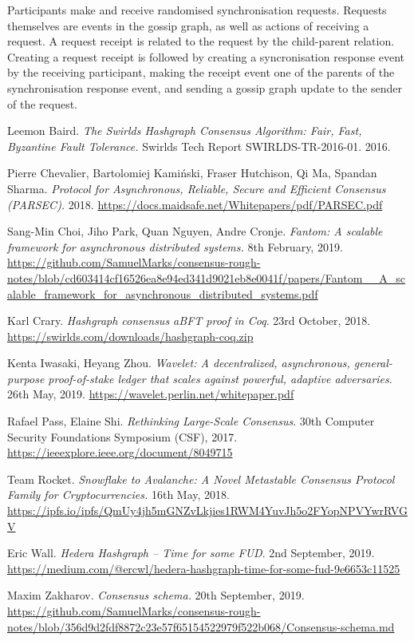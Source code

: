\documentclass[a4paper,11pt]{article}
\begin{document}
Participants make and receive randomised synchronisation requests. Requests themselves are events in
the gossip graph, as well as actions of receiving a request. A request receipt is related to the
request by the child-parent relation. Creating a request receipt is followed by creating a
syncronisation response event by the receiving participant, making the receipt event one of the
parents of the synchronisation response event, and sending a gossip graph update to the sender of
the request.


\begin{thebibliography}{10}

   Leemon Baird. \emph{The Swirlds Hashgraph Consensus Algorithm: Fair, Fast,
    Byzantine Fault Tolerance.} Swirlds Tech Report SWIRLDS-TR-2016-01. 2016.

   Pierre Chevalier, Bartolomiej Kamiński, Fraser Hutchison, Qi Ma, Spandan
    Sharma. \emph{Protocol for Asynchronous, Reliable, Secure and Efficient Consensus (PARSEC).}
    2018. \url{https://docs.maidsafe.net/Whitepapers/pdf/PARSEC.pdf}

   Sang-Min Choi, Jiho Park, Quan Nguyen, Andre Cronje. \emph{Fantom: A scalable
    framework for asynchronous distributed systems.} 8th February, 2019.
    \url{https://github.com/SamuelMarks/consensus-rough-notes/blob/cd603414cf16526ea8e94ed341d9021eb8e0041f/papers/Fantom__A_scalable_framework_for_asynchronous_distributed_systems.pdf}

   Karl Crary. \emph{Hashgraph consensus aBFT proof in Coq}. 23rd October,
    2018. \url{https://swirlds.com/downloads/hashgraph-coq.zip}

   Kenta Iwasaki, Heyang Zhou. \emph{Wavelet: A decentralized, asynchronous,
    general-purpose proof-of-stake ledger that scales against powerful, adaptive adversaries}. 26th
    May, 2019.  \url{https://wavelet.perlin.net/whitepaper.pdf}

   Rafael Pass, Elaine Shi. \emph{Rethinking Large-Scale Consensus}. 30th
    Computer Security Foundations Symposium (CSF),
    2017. \url{https://ieeexplore.ieee.org/document/8049715}

   Team Rocket. \emph{Snowflake to Avalanche: A Novel Metastable Consensus
    Protocol Family for Cryptocurrencies.} 16th May,
    2018. \url{https://ipfs.io/ipfs/QmUy4jh5mGNZvLkjies1RWM4YuvJh5o2FYopNPVYwrRVGV}

   Eric Wall. \emph{Hedera Hashgraph -- Time for some FUD}. 2nd September,
    2019.  \url{https://medium.com/@ercwl/hedera-hashgraph-time-for-some-fud-9e6653c11525}

   Maxim Zakharov. \emph{Consensus schema.} 20th September,
    2019. \url{https://github.com/SamuelMarks/consensus-rough-notes/blob/356d9d2fdf8872c23e57f65154522979f522b068/Consensus-schema.md}

\end{thebibliography}
\end{document}
